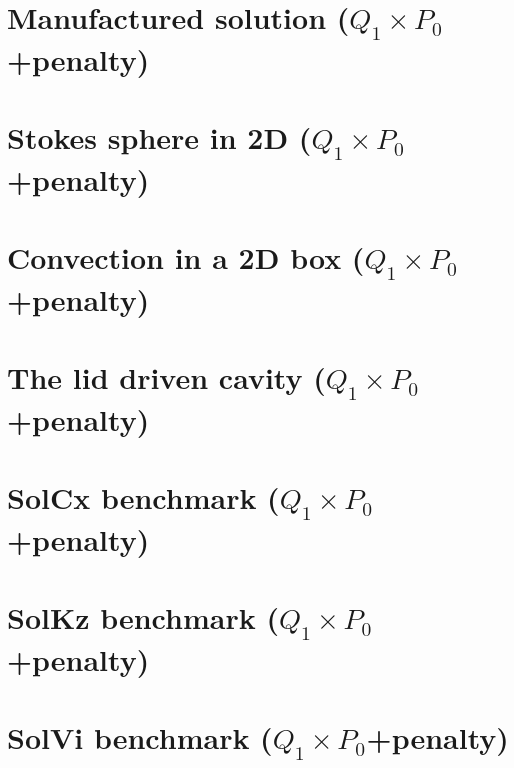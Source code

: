\documentclass[a4paper,11pt]{report}
\begin{document}
\chapter{Manufactured solution ($Q_1\times P_0$+penalty)\label{f01}} %

\chapter{Stokes sphere in 2D ($Q_1\times P_0$+penalty) \label{f02}} %

\chapter{Convection in a 2D box ($Q_1\times P_0$+penalty)\label{f03}} %

\chapter{The lid driven cavity ($Q_1\times P_0$+penalty) \label{f04}} %

\chapter{SolCx benchmark ($Q_1\times P_0$+penalty)\label{f05}} %

\chapter{SolKz benchmark ($Q_1\times P_0$+penalty)\label{f06}} %

\chapter{SolVi benchmark ($Q_1\times P_0$+penalty) \label{f07}} %
\end{document}
